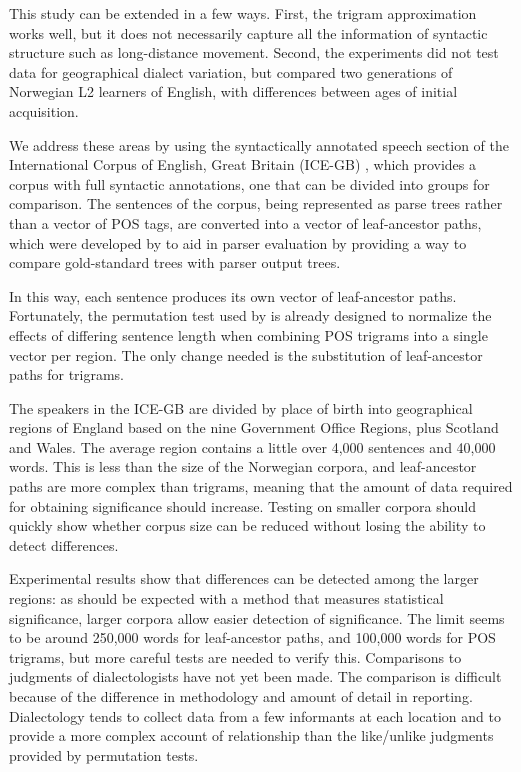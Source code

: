 \documentclass[11pt]{article}
\begin{document}
This study can be extended in a few ways.
First, the trigram approximation works well, but it
does not necessarily capture all the information of syntactic
structure such as long-distance movement. Second,
the experiments did not test data for geographical dialect variation,
but compared two generations of Norwegian L2 learners of English, with
differences between ages of initial acquisition.

We address these areas by using the syntactically annotated speech
section of the International Corpus of English, Great Britain (ICE-GB)
\cite{nelson02}, which provides a corpus with full syntactic annotations,
one that can be divided into groups for comparison. The sentences
of the corpus, being represented as parse trees rather than a vector
of POS tags, are
converted into a vector of leaf-ancestor paths, which were developed
by \cite{sampson00} to aid in parser evaluation by providing a way to
compare gold-standard trees with parser output trees.

In this way, each sentence produces its own vector of leaf-ancestor
paths. Fortunately, the
permutation test used by \cite{nerbonne06} is already designed to
normalize the effects of differing sentence length when combining POS
trigrams into a single vector per region. The only change needed is
the substitution of leaf-ancestor paths for trigrams.

The speakers in the ICE-GB are divided by place of birth into
geographical regions of
England based on the nine Government Office Regions, plus Scotland and
Wales. The
average region contains a little over 4,000
sentences and 40,000 words. This is less than the size of the
Norwegian corpora, and leaf-ancestor paths are more
complex than trigrams, meaning that the amount of data required for
obtaining significance should increase. Testing on smaller corpora
should quickly show whether corpus size can be reduced without losing
the ability to detect differences.

Experimental results show that differences can be detected among the
larger regions: as should be expected with a method
that measures statistical significance, larger corpora allow easier
detection of significance. The limit seems to be around 250,000 words for
leaf-ancestor paths, and 100,000 words for POS trigrams, but more careful
tests are needed to verify this.
Comparisons to judgments of dialectologists have not yet
been made. The comparison is difficult because of the
difference in methodology and amount of detail in
reporting. Dialectology tends to collect data from a few informants
at each location and to provide a more complex account of relationship
than the like/unlike judgments provided by permutation tests.
\end{document}
